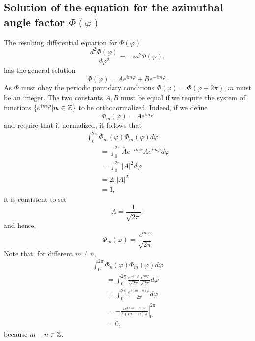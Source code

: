 \subsection{Solution of the equation  for the azimuthal angle factor $\Phi(\varphi )$}

The  resulting differential equation  for $\Phi(\varphi )$
\begin{equation}
\frac{   d   ^2\Phi(\varphi )}{   d    \varphi^2 }
=  -m^2\Phi(\varphi),
\label{2011-m-ch-qaephi}
\end{equation}
has the general solution
\begin{equation}
\Phi(\varphi) = Ae^{im\varphi}+B e^{-im\varphi}.
\label{2011-m-ch-qae11}
\end{equation}
As $\Phi$ must obey the periodic poundary conditions $\Phi(\varphi)=\Phi(\varphi  +2\pi)$,
$m$ must be an integer.
The two constants $A,B$ must be equal if we require the system of functions $\{e^{im\varphi}\vert m \in {\Bbb Z}\}$
to be orthonormalized.
Indeed, if we define
\begin{equation}
\Phi_m(\varphi) = Ae^{im\varphi}
\label{2011-m-ch-qae11def}
\end{equation}
and require that it normalized, it follows that
\begin{equation}
\begin{array}{l}
\int_0^{2\pi} \overline {\Phi}_m(\varphi) \Phi_m(\varphi)d \varphi \\
\qquad     =
\int_0^{2\pi} \overline {A}e^{-im\varphi}Ae^{im\varphi} d \varphi \\
\qquad    =
\int_0^{2\pi}\vert A\vert^2 d \varphi \\
\qquad  = 2\pi  \vert A\vert^2  \\
\qquad
= 1,
\end{array}
\label{2011-m-ch-qae11normexpl}
\end{equation}
it is consistent to set
\begin{equation}
A= \frac{1} {\sqrt{2\pi } };
\label{2011-m-ch-qae11normexpln}
\end{equation}
and hence,
\begin{equation}
\Phi_m(\varphi) = \frac{e^{im\varphi}} {\sqrt{2\pi }  }
\label{2011-m-ch-qae11normexplnendg}
\end{equation}
Note that, for different $m\neq n$,
\begin{equation}
\begin{array}{l}
\int_0^{2\pi} \overline {\Phi}_n(\varphi) \Phi_m(\varphi)d \varphi \\
\qquad =
\int_0^{2\pi} \frac{e^{-in\varphi}} {\sqrt{2\pi }  } \frac{e^{im\varphi}} {\sqrt{2\pi }}  d \varphi \\
\qquad =
\int_0^{2\pi} \frac{e^{i(m-n)\varphi}} { 2\pi  }   d \varphi \\
\qquad =
\left. -\frac{i e^{i(m-n)\varphi}} { 2(m-n)\pi  } \right|_0^{2\pi}\\
\qquad = 0,
\end{array}
\label{2011-m-ch-qae11normexplnoni}
\end{equation}
because $m-n\in {\Bbb Z}$.

